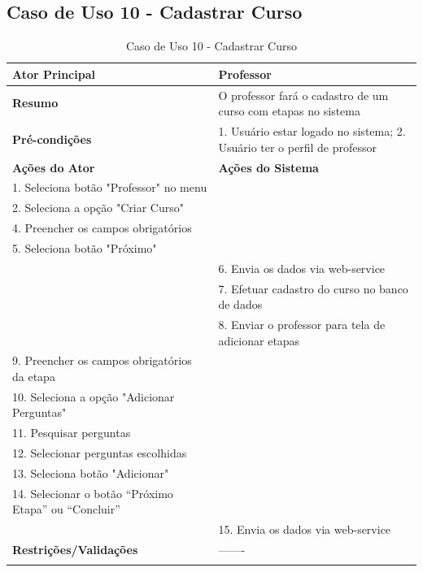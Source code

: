 \subsection{Caso de Uso 10 - Cadastrar Curso}
\label{sc:case10}
\begin{center}
\begin{longtable}{p{8cm}|p{8cm}}
    \hline
    \textbf{Ator Principal} & Professor \\
    \hline
    \textbf{Resumo} & O professor fará o cadastro de um curso com etapas no sistema \\
    \hline
    \textbf{Pr\'{e}-condi\c{c}\~{o}es} & 1. Usuário estar logado no sistema; 2. Usuário ter o perfil de professor \\
    \hline
    \textbf{A\c{c}\~{o}es do Ator} & \textbf{A\c{c}\~{o}es do Sistema} \\
    \hline
    1. Seleciona botão "Professor" no menu \\
    \hline
    2. Seleciona a opção "Criar Curso" \\
	\hline
    4. Preencher os campos obrigatórios \\
	\hline
    5. Seleciona botão "Próximo" \\
    \hline
    & 6. Envia os dados via web-service \\
	\hline
    & 7. Efetuar cadastro do curso no banco de dados \\
	\hline
    & 8. Enviar o professor para tela de adicionar etapas \\
	\hline
    9. Preencher os campos obrigatórios da etapa \\
	\hline
    10. Seleciona a opção "Adicionar Perguntas" \\
	\hline
    11. Pesquisar perguntas \\
	\hline
    12. Selecionar perguntas escolhidas \\
	\hline
    13. Seleciona botão "Adicionar" \\
	\hline
    14. Selecionar o botão “Próximo Etapa” ou “Concluir” \\
	\hline
    & 15. Envia os dados via web-service \\
    \hline
    \hline
    \textbf{Restri\c{c}\~{o}es/Valida\c{c}\~{o}es} & -------\\
\hline
\caption{Caso de Uso 10 - Cadastrar Curso}
\end{longtable}
\end{center}

